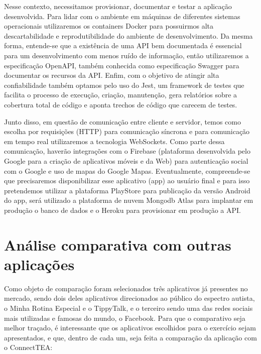 \begin{apendicesenv}
Nesse contexto, necessitamos provisionar, documentar e testar a aplicação desenvolvida. Para lidar com o ambiente em máquinas de diferentes sistemas operacionais utilizaremos os containers Docker para possuirmos alta descartabilidade e reprodutibilidade do ambiente de desenvolvimento. Da mesma forma, entende-se que a existência de uma API bem documentada é essencial para um desenvolvimento com menos ruído de informação, então utilizaremos a especificação OpenAPI, também conhecida como especificação Swagger para documentar os recursos da API. Enfim, com o objetivo de atingir alta confiabilidade também optamos pelo uso do Jest, um framework de testes que facilita o processo de execução, criação, manutenção, gera relatórios sobre a cobertura total de código e aponta trechos de código que carecem de testes.

Junto disso, em questão de comunicação entre cliente e servidor, temos como escolha por requisições (HTTP) para comunicação síncrona e para comunicação em tempo real utilizaremos a tecnologia WebSockets. Como parte dessa comunicação, haverão integrações com o Firebase (plataforma desenvolvida pelo Google para a criação de aplicativos móveis e da Web) para autenticação social com o Google e uso de mapas do Google Mapas.
Eventualmente, compreende-se que precisaremos disponibilizar esse aplicativo (app) ao usuário final e para isso pretendemos utilizar a plataforma PlayStore para publicação da versão Android do app, será utilizado a plataforma de nuvem Mongodb Atlas para implantar em produção o banco de dados e o Heroku para provisionar em produção a API.



\section{Análise comparativa com outras aplicações}
Como objeto de comparação foram selecionados três aplicativos já presentes no mercado, sendo dois deles aplicativos direcionados ao público do espectro autista, o Minha Rotina Especial e o TippyTalk, e o terceiro sendo uma das redes sociais mais utilizadas e famosas do mundo, o Facebook.
Para que o comparativo seja melhor traçado, é interessante que os aplicativos escolhidos para o exercício sejam apresentados, e que, dentro de cada um, seja feita a comparação da aplicação com o ConnectTEA:


\end{apendicesenv}
